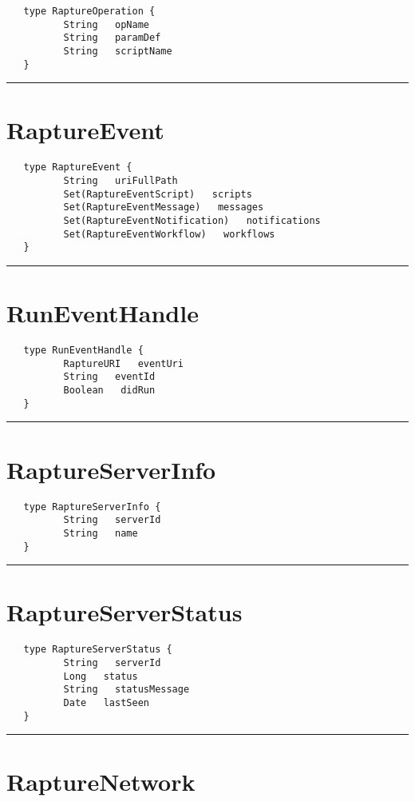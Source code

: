 \begin{verbatim}
   type RaptureOperation {
          String   opName
          String   paramDef
          String   scriptName
   }
\end{verbatim}

\rule{15cm}{2pt}
\section{RaptureEvent}
\label{type:RaptureEvent}

\begin{verbatim}
   type RaptureEvent {
          String   uriFullPath
          Set(RaptureEventScript)   scripts
          Set(RaptureEventMessage)   messages
          Set(RaptureEventNotification)   notifications
          Set(RaptureEventWorkflow)   workflows
   }
\end{verbatim}

\rule{15cm}{2pt}
\section{RunEventHandle}
\label{type:RunEventHandle}

\begin{verbatim}
   type RunEventHandle {
          RaptureURI   eventUri
          String   eventId
          Boolean   didRun
   }
\end{verbatim}

\rule{15cm}{2pt}
\section{RaptureServerInfo}
\label{type:RaptureServerInfo}

\begin{verbatim}
   type RaptureServerInfo {
          String   serverId
          String   name
   }
\end{verbatim}

\rule{15cm}{2pt}
\section{RaptureServerStatus}
\label{type:RaptureServerStatus}

\begin{verbatim}
   type RaptureServerStatus {
          String   serverId
          Long   status
          String   statusMessage
          Date   lastSeen
   }
\end{verbatim}

\rule{15cm}{2pt}
\section{RaptureNetwork}
\label{type:RaptureNetwork}

